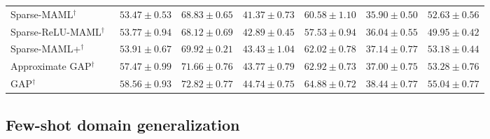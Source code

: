 \begin{table*}[t!]
{\begin{tabular}{lcccccc}
    Sparse-MAML$^{\dagger}$~\cite{von2021learning}         & $53.47\pm0.53$ & $68.83\pm0.65$   & $41.37\pm0.73$ & $60.58\pm1.10$ & $35.90\pm0.50$ & $52.63\pm0.56$ \\
    Sparse-ReLU-MAML$^{\dagger}$~\cite{von2021learning}    & $53.77\pm0.94$ & $68.12\pm0.69$   & $42.89\pm0.45$ & $57.53\pm0.94$ & $36.04\pm0.55$ & $49.95\pm0.42$ \\
    Sparse-MAML+$^{\dagger}$~\cite{von2021learning}        & $53.91\pm0.67$ & $69.92\pm0.21$   & $43.43\pm1.04$ & $62.02\pm0.78$ & $37.14\pm0.77$ & $53.18\pm0.44$ \\
    \midrule
    Approximate GAP$^{\dagger}$   & $57.47 \pm 0.99$ & $71.66 \pm 0.76$ & $43.77 \pm 0.79$ & $62.92 \pm 0.73$ & $37.00 \pm 0.75$ & $53.28 \pm 0.76$\\
    GAP$^{\dagger}$             & $\mathbf{58.56\pm0.93}$ & $\mathbf{72.82\pm0.77}$   & $\mathbf{44.74\pm0.75}$ & $\mathbf{64.88\pm0.72}$ & $\mathbf{38.44\pm0.77}$ & $\mathbf{55.04\pm0.77}$ \\
    \bottomrule
  \end{tabular}
  }
  \label{tab:cross_domain}
\end{table*}

\subsection{Few-shot domain generalization}
